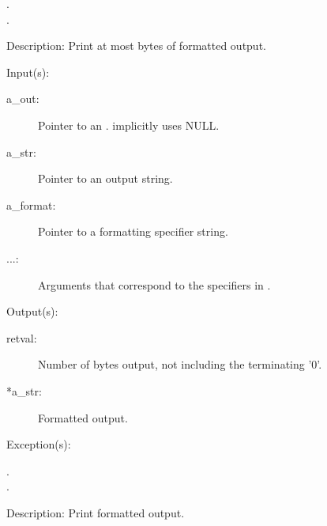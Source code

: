 \begin{capi}
\begin{capilist}
\begin{description}
		\item[.]
		\item[.]
		\end{description}
	\item[Description: ]
		Print at most  bytes of formatted output.
	\end{capilist}
\label{out_put_s}
\label{_cw_out_put_s}
	\begin{capilist}
	\item[Input(s): ]
		\begin{description}\item[]
		\item[a\_out: ]
			Pointer to an .
			 implicitly uses NULL.
		\item[a\_str: ]
			Pointer to an output string.
		\item[a\_format: ]
			Pointer to a formatting specifier string.
		\item[...: ]
			Arguments that correspond to the specifiers in
			.
		\end{description}
	\item[Output(s): ]
		\begin{description}\item[]
		\item[retval: ]
			Number of bytes output, not including the terminating
			'{\bs}0'.
		\item[*a\_str: ]
			Formatted output.
		\end{description}
	\item[Exception(s): ]
		\begin{description}\item[]
		\item[.]
		\item[.]
		\end{description}
	\item[Description: ]
		Print formatted output.
	\end{capilist}
\label{out_put_sa}

\end{capi}

